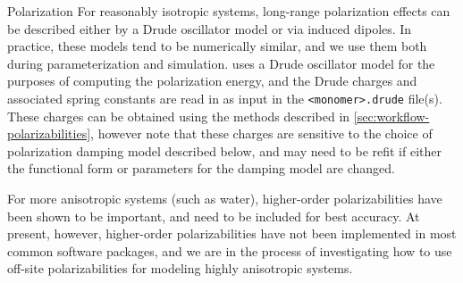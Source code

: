 \begin{paragraph}{Polarization}
For reasonably isotropic systems, long-range polarization effects can be described
either by a Drude oscillator model or via induced
dipoles.\cite{Rick2002,Lopes2009} In practice, these models tend to be
numerically similar, and we use them both during parameterization and
simulation.\footnotemark{} \pointer uses a Drude oscillator model for the
purposes of computing the polarization energy, and the Drude charges and
associated spring constants are read in as input in the \verb|<monomer>.drude|
file(s). These charges can be obtained using the methods described in
\cref{sec:workflow-polarizabilities}, however note that these charges are
sensitive to the choice of polarization damping model described below, and may
need to be refit if either the functional form or parameters for the damping
model are changed.

For more anisotropic systems (such as water), higher-order polarizabilities
have been shown to be important, and need to be included for best
accuracy.\cite{Cisneros2016,Misquitta2008b,Misquitta2016,Welch2008}
At present, however, higher-order polarizabilities have not been implemented
in most common software packages, and we are in the process of investigating
how to use off-site polarizabilities for modeling highly anisotropic systems.
\end{paragraph}



